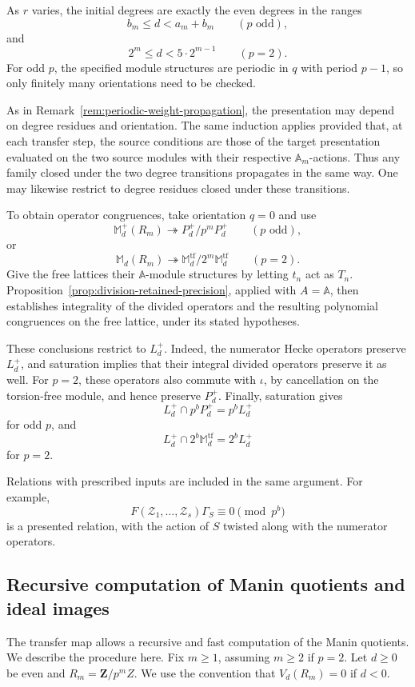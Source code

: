 \documentclass[11pt]{article}
\newcommand{\Z}{\mathbf Z}
\theoremstyle{plain}
\theoremstyle{definition}
\theoremstyle{remark}
\numberwithin{equation}{section}
\begin{document}
As \(r\) varies, the initial degrees are exactly the even degrees in the ranges \[ b_m\leq d<a_m+b_m \qquad(p\text{ odd}), \] and \[ 2^m\leq d<5\cdot2^{m-1} \qquad(p=2). \] For odd \(p\), the specified module structures are periodic in \(q\) with period \(p-1\), so only finitely many orientations need to be checked.

As in Remark~\ref{rem:periodic-weight-propagation}, the presentation may depend on degree residues and orientation. The same induction applies provided that, at each transfer step, the source conditions are those of the target presentation evaluated on the two source modules with their respective \(\mathbb A_m\)-actions. Thus any family closed under the two degree transitions propagates in the same way. One may likewise restrict to degree residues closed under these transitions. 

To obtain operator congruences, take orientation \(q=0\) and use \[ \mathbb M_d^+(R_m) \twoheadrightarrow P_d^+/p^mP_d^+ \qquad(p\text{ odd}), \] or \[\mathbb M_d(R_m) \twoheadrightarrow \mathbb M_d^{\mathrm{tf}}/2^m\mathbb M_d^{\mathrm{tf}} \qquad(p=2). \] Give the free lattices their \(\mathbb A\)-module structures by letting \(t_n\) act as \(T_n\). Proposition~\ref{prop:division-retained-precision}, applied with \(A=\mathbb A\), then establishes integrality of the divided operators and the resulting polynomial congruences on the free lattice, under its stated hypotheses.

These conclusions restrict to \(L_d^+\). Indeed, the numerator Hecke operators preserve \(L_d^+\), and saturation implies that their integral divided operators preserve it as well. For \(p=2\), these operators also commute with \(\iota\), by cancellation on the torsion-free module, and hence preserve \(P_d^+\). Finally, saturation gives \[ L_d^+\cap p^bP_d^+=p^bL_d^+ \] for odd \(p\), and \[ L_d^+\cap 2^b\mathbb M_d^{\mathrm{tf}}=2^bL_d^+ \] for \(p=2\).

Relations with prescribed inputs are included in the same argument. For example, \[ F(\mathcal Z_1,\ldots,\mathcal Z_s)\Gamma_S \equiv0\pmod{p^b} \] is a presented relation, with the action of \(S\) twisted along with the numerator operators.

\subsection{Recursive computation of Manin quotients and ideal images}
The transfer map allows a recursive and fast computation of the Manin quotients. We describe the procedure here. Fix \(m\geq1\), assuming \(m\geq2\) if \(p=2\). Let $d \geq 0$ be even and $R_m = \Z/p^m Z$. We use the convention that \(V_d(R_m) = 0\) if \(d < 0\). 
\end{document}
